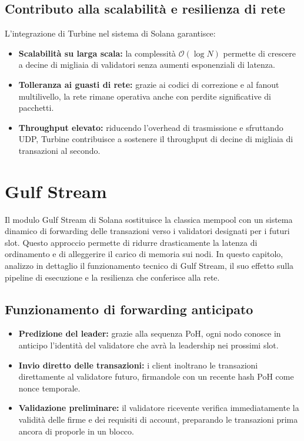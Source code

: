 \documentclass[a4paper,12pt]{report}
\begin{document}
	\subsection{Contributo alla scalabilità e resilienza di rete}
	L’integrazione di Turbine nel sistema di Solana garantisce:  
	\begin{itemize}
		\item \textbf{Scalabilità su larga scala:} la complessità \(\mathcal{O}(\log N)\) permette di crescere a decine di migliaia di validatori senza aumenti esponenziali di latenza.
		\item \textbf{Tolleranza ai guasti di rete:} grazie ai codici di correzione e al fanout multilivello, la rete rimane operativa anche con perdite significative di pacchetti.
		\item \textbf{Throughput elevato:} riducendo l’overhead di trasmissione e sfruttando UDP, Turbine contribuisce a sostenere il throughput di decine di migliaia di transazioni al secondo.
	\end{itemize}
	
	\section{Gulf Stream}
	
	Il modulo Gulf Stream di Solana sostituisce la classica mempool con un sistema dinamico di forwarding delle transazioni verso i validatori designati per i futuri slot. Questo approccio permette di ridurre drasticamente la latenza di ordinamento e di alleggerire il carico di memoria sui nodi. In questo capitolo, analizzo in dettaglio il funzionamento tecnico di Gulf Stream, il suo effetto sulla pipeline di esecuzione e la resilienza che conferisce alla rete.
	
	\subsection{Funzionamento di forwarding anticipato}
	\begin{itemize}
		\item \textbf{Predizione del leader:} grazie alla sequenza PoH, ogni nodo conosce in anticipo l’identità del validatore che avrà la leadership nei prossimi slot.
		\item \textbf{Invio diretto delle transazioni:} i client inoltrano le transazioni direttamente al validatore futuro, firmandole con un recente hash PoH come nonce temporale.
		\item \textbf{Validazione preliminare:} il validatore ricevente verifica immediatamente la validità delle firme e dei requisiti di account, preparando le transazioni prima ancora di proporle in un blocco.
	\end{itemize}
	
\end{document}
